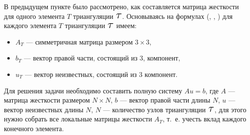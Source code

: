 \documentclass[12pt, a4paper]{article}
\newcommand\Tau{\scalerel*{\tau}{T}}
\begin{document}
				В предыдущем пункте было рассмотрено, как составляется матрица жесткости для одного элемента $T$ триангуляции $\Tau$. Основываясь на формулах (, , ) для каждого элемента $T$ триангуляции $\Tau$  имеем: 
				\begin{itemize}
					\item $A_T$ --- симметричная матрица размером $3 \times 3$,
					\item $b_T$ --- вектор правой части, состоящий из 3, компонент,
					\item $u_T$ --- вектор неизвестных, состоящий из 3 компонент.
				\end{itemize}
								
				\noindent
				Для решения задачи необходимо составить полную систему $Au = b$, где $A$ --- матрица жесткости размером $N \times N$, $b$ --- вектор правой части длины $N$, $u$ --- вектор неизвестных длины $N$, $N$ --- количество узлов триангуляции $\Tau$, для этого нужно собрать все локальные матрицы жесткости $A_T$, т.~е. учесть вклад каждого конечного элемента.
				
\end{document}

